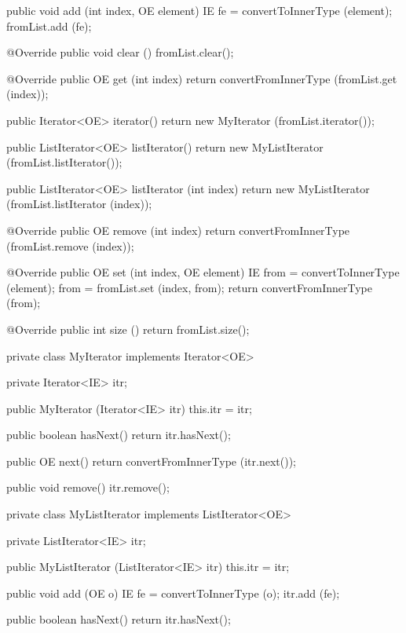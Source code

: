 \begin{code}\begin{hide}

   public void add (int index, OE element) {
      IE fe = convertToInnerType (element);
      fromList.add (fe);
   }

   @Override
   public void clear () {
      fromList.clear();
   }

   @Override
   public OE get (int index) {
      return convertFromInnerType (fromList.get (index));
   }
   
   public Iterator<OE> iterator() {
      return new MyIterator (fromList.iterator());
   }

   public ListIterator<OE> listIterator() {
      return new MyListIterator (fromList.listIterator());
   }

   public ListIterator<OE> listIterator (int index) {
      return new MyListIterator (fromList.listIterator (index));
   }

   @Override
   public OE remove (int index) {
      return convertFromInnerType (fromList.remove (index));
   }

   @Override
   public OE set (int index, OE element) {
      IE from = convertToInnerType (element);
      from = fromList.set (index, from);
      return convertFromInnerType (from);
   }

   @Override
   public int size () {
      return fromList.size();
   }

   private class MyIterator implements Iterator<OE> {
      private Iterator<IE> itr;

      public MyIterator (Iterator<IE> itr) {
         this.itr = itr;
      }

      public boolean hasNext() {
         return itr.hasNext();
      }

      public OE next() {
         return convertFromInnerType (itr.next());
      }
      
      public void remove() {
         itr.remove();
      }
   }

   private class MyListIterator implements ListIterator<OE> {
      private ListIterator<IE> itr;
   
      public MyListIterator (ListIterator<IE> itr) {
         this.itr = itr;
      }

      public void add (OE o) {
         IE fe = convertToInnerType (o);
         itr.add (fe);
      }

      public boolean hasNext() {
         return itr.hasNext();
      }

}
\end{hide}
\end{code}
